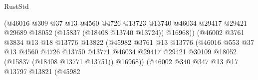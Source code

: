 \begin{lexlean}{RustStd}
\begin{coremodule}
                                            (@46016
                                              @309
                                              @37
                                              @13
                                              @4560
                                              @4726
                                              @13723
                                              @13740
                                              @46034
                                              @29417
                                              @29421
                                              @29689
                                              @18052
                                              (@15837 (@18408 @13740 @13724))
                                              @16968))
                                          (@46002
                                            @3761
                                            @3834
                                            @13
                                            @18
                                            @13776
                                            @13822
                                            (@45982
                                              @3761
                                              @13
                                              @13776
                                              (@46016
                                                @553
                                                @37
                                                @13
                                                @4560
                                                @4726
                                                @13750
                                                @13771
                                                @46034
                                                @29417
                                                @29421
                                                @30109
                                                @18052
                                                (@15837 (@18408 @13771 @13751))
                                                @16968))
                                            (@46002
                                              @340
                                              @347
                                              @13
                                              @17
                                              @13797
                                              @13821
                                              (@45982

\end{coremodule}
\end{lexlean}
